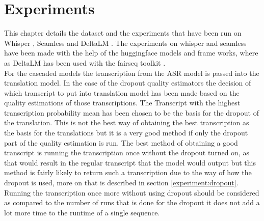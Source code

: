 
\chapter{Experiments}
\label{ch:experiment}
This chapter details the dataset and the experiments that have been run on Whisper \cite{radford2022robust}, Seamless \cite{seamless2023} and DeltaLM \cite{ma2021deltalm}.
The experiments on whisper and seamless have been made with the help of the huggingface \cite{huggingface}\cite{huggingfaceseamless}\cite{huggingfacewhisper} models and frame works, where as DeltaLM has been used with the fairseq toolkit \cite{ott2019fairseqfastextensibletoolkit}.\\
For the cascaded models the transcription from the ASR model is passed into the translation model. 
In the case of the dropout quality estimators the decision of which transcript to put into translation model has been made based on the quality estimations of those transcriptions.
The Transcript with the highest transcription probability mean has been chosen to be the basis for the dropout of the translation. 
This is not the best way of obtaining the best transcription as the basis for the translations but it is a very good method if only the dropout part of the quality estimation is run. 
The best method of obtaining a good transcript is running the transcription once without the dropout turned on, as that would result in the regular transcript that the model would output but this method is fairly likely to return such a transcription due to the way of how the dropout is used, more on that is described in section \ref{experiment:dropout}.
Running the transcription once more without using dropout should be considered as compared to the number of runs that is done for the dropout it does not add a lot more time to the runtime of a single sequence.



